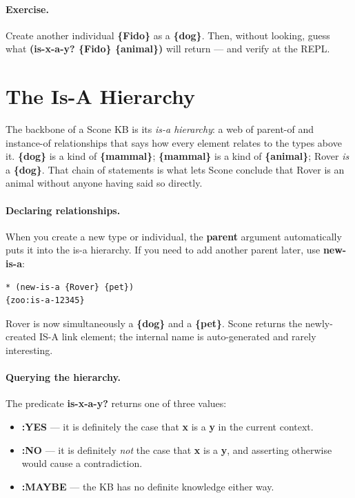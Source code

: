 \documentclass[titlepage,twoside,openright,11pt]{article}
\begin{document}
\paragraph{Exercise.}
Create another individual \textbf{\{Fido\}} as a \textbf{\{dog\}}.
Then, without looking, guess what \textbf{(is-x-a-y? \{Fido\}
\{animal\})} will return --- and verify at the REPL.

\section{The Is-A Hierarchy}\label{the-is-a-hierarchy}

The backbone of a Scone KB is its \emph{is-a hierarchy}: a web of
parent-of and instance-of relationships that says how every element
relates to the types above it. \textbf{\{dog\}} is a kind of
\textbf{\{mammal\}}; \textbf{\{mammal\}} is a kind of
\textbf{\{animal\}}; Rover \emph{is} a \textbf{\{dog\}}. That chain
of statements is what lets Scone conclude that Rover is an animal
without anyone having said so directly.

\paragraph{Declaring relationships.}
When you create a new type or individual, the \textbf{parent}
argument automatically puts it into the is-a hierarchy. If you need
to add another parent later, use \textbf{new-is-a}:

\begin{verbatim}
* (new-is-a {Rover} {pet})
{zoo:is-a-12345}
\end{verbatim}

Rover is now simultaneously a \textbf{\{dog\}} and a
\textbf{\{pet\}}. Scone returns the newly-created IS-A link
element; the internal name is auto-generated and rarely interesting.

\paragraph{Querying the hierarchy.}
The predicate \textbf{is-x-a-y?} returns one of three values:

\begin{itemize}
\item
  \textbf{:YES} --- it is definitely the case that \textbf{x} is a
  \textbf{y} in the current context.
\item
  \textbf{:NO} --- it is definitely \emph{not} the case that
  \textbf{x} is a \textbf{y}, and asserting otherwise would cause a
  contradiction.
\item
  \textbf{:MAYBE} --- the KB has no definite knowledge either way.
\end{itemize}
\end{document}
